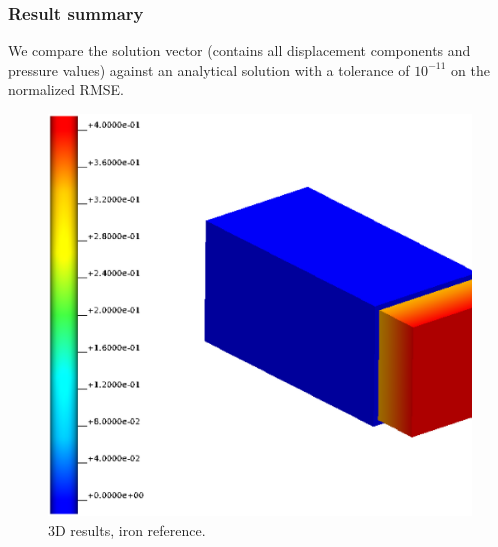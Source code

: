 \subsubsection{Result summary}
%
We compare the solution vector (contains all displacement components and
pressure values) against an analytical solution with a tolerance of $10^{-11}$
on the normalized RMSE.
%


%
\begin{figure}[h!]
    \centering 
    \includegraphics[width=0.9\columnwidth]{examples/example-0201-u/doc/figures/iron_reference_3D.eps} 
    \caption{3D results, iron reference.}
    \label{example-0201-u-iron-3D-reference-fig}
\end{figure}
%

